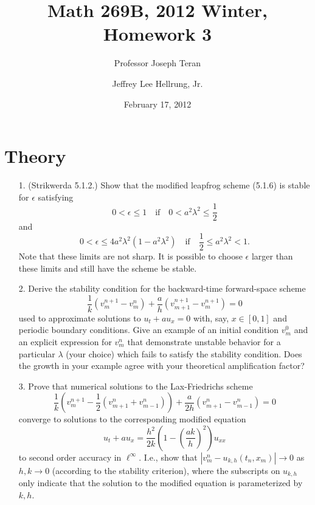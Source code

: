 \documentclass{article}
\providecommand{\abs}[1]{\left\lvert#1\right\rvert}
\begin{document}
\title{Math 269B, 2012 Winter, Homework 3}
\date{February 17, 2012}
\author{Professor Joseph Teran \and Jeffrey Lee Hellrung, Jr.}
\maketitle

\section{Theory}

\begin{itemize}

\item[1.] (Strikwerda 5.1.2.) Show that the modified leapfrog scheme (5.1.6) is stable for $\epsilon$ satisfying
\begin{equation*}
0 < \epsilon \leq 1 \quad \text{if} \quad 0 < a^2 \lambda^2 \leq \frac{1}{2}
\end{equation*}
and
\begin{equation*}
0 < \epsilon \leq 4 a^2 \lambda^2 \left( 1 - a^2 \lambda^2 \right) \quad \text{if} \quad \frac{1}{2} \leq a^2 \lambda^2 < 1.
\end{equation*}
Note that these limits are not sharp. It is possible to choose $\epsilon$ larger than these limits and still have the scheme be stable.

\item[2.] Derive the stability condition for the backward-time forward-space scheme
\begin{equation*}
\frac{1}{k} \left( v^{n+1}_m - v^n_m \right) + \frac{a}{h} \left( v^{n+1}_{m+1} - v^{n+1}_m \right) = 0
\end{equation*}
used to approximate solutions to $u_t + a u_x = 0$ with, say, $x \in [0,1]$ and periodic boundary conditions. Give an example of an initial condition $v^0_m$ and an explicit expression for $v^n_m$ that demonstrate unstable behavior for a particular $\lambda$ (your choice) which fails to satisfy the stability condition. Does the growth in your example agree with your theoretical amplification factor?

\item[3.] Prove that numerical solutions to the Lax-Friedrichs scheme
\begin{equation*}
\frac{1}{k} \left( v^{n+1}_m - \frac{1}{2} \left( v^n_{m+1} + v^n_{m-1} \right) \right) + \frac{a}{2h} \left( v^n_{m+1} - v^n_{m-1} \right) = 0
\end{equation*}
converge to solutions to the corresponding modified equation
\begin{equation*}
u_t + a u_x = \frac{h^2}{2k} \left( 1 - \left( \frac{a k}{h} \right)^2 \right) u_{xx}
\end{equation*}
to second order accuracy in $\ell^{\infty}$. I.e., show that $\abs{v^n_m - u_{k,h} \left( t_n,x_m \right)} \to 0$ as $h,k \to 0$ (according to the stability criterion), where the subscripts on $u_{k,h}$ only indicate that the solution to the modified equation is parameterized by $k,h$.


\end{itemize}
\end{document}
